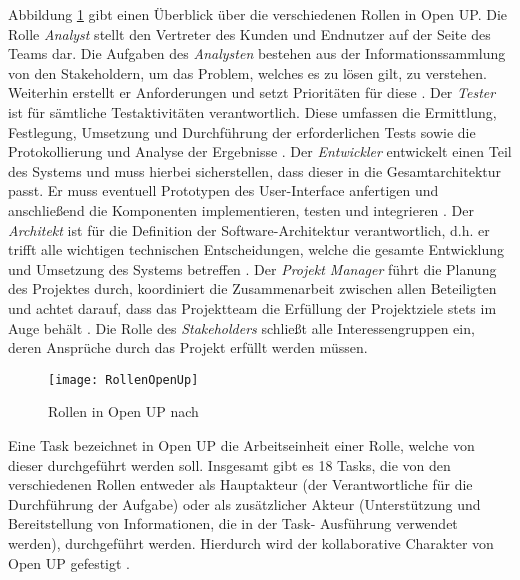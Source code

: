 Abbildung \ref{fig:RollenOpenUp} gibt einen Überblick über die verschiedenen Rollen in Open UP. Die Rolle \textit{Analyst} stellt den Vertreter des Kunden und Endnutzer auf der Seite des Teams dar. Die Aufgaben des \textit{Analysten} bestehen aus der Informationssammlung von den Stakeholdern, um das Problem, welches es zu lösen gilt, zu verstehen. Weiterhin erstellt er Anforderungen und setzt Prioritäten für diese \cite{OpenUPProcess}.\newline
Der \textit{Tester} ist für sämtliche Testaktivitäten verantwortlich. Diese umfassen die Ermittlung, Festlegung, Umsetzung und Durchführung der erforderlichen Tests sowie die Protokollierung und Analyse der Ergebnisse \cite{OpenUPProcess}.
Der \textit{Entwickler} entwickelt einen Teil des Systems und muss hierbei sicherstellen, dass dieser in die Gesamtarchitektur passt. Er muss eventuell Prototypen des User-Interface anfertigen und anschließend die Komponenten implementieren, testen und integrieren \cite{OpenUPProcess}.\newline
Der \textit{Architekt} ist für die Definition der Software-Architektur verantwortlich, d.h. er trifft alle wichtigen technischen Entscheidungen, welche die gesamte Entwicklung und Umsetzung des Systems betreffen \cite{OpenUPProcess}.\newline
Der \textit{Projekt Manager} führt die Planung des Projektes durch, koordiniert die Zusammenarbeit zwischen allen Beteiligten und achtet darauf, dass das Projektteam die Erfüllung der Projektziele stets im Auge behält \cite{OpenUPProcess}.\newline
Die Rolle des \textit{Stakeholders} schließt alle Interessengruppen ein, deren Ansprüche durch das Projekt erfüllt werden müssen. \newline

\begin{figure}[htp]
\begin{center}
  \texttt{[image: RollenOpenUp]} %
  \caption{Rollen in Open UP nach \cite{openup}}
  \label{fig:RollenOpenUp}
\end{center}
\end{figure}

Eine Task bezeichnet in Open UP die Arbeitseinheit einer Rolle, welche von dieser durchgeführt werden soll. Insgesamt gibt es 18 Tasks, die von den verschiedenen Rollen entweder als Hauptakteur (der Verantwortliche für die Durchführung der Aufgabe) oder als zusätzlicher Akteur (Unterstützung und Bereitstellung von Informationen, die in der Task- Ausführung verwendet werden), durchgeführt werden. Hierdurch wird der kollaborative Charakter von Open UP gefestigt \cite{eclipseopenup}.

